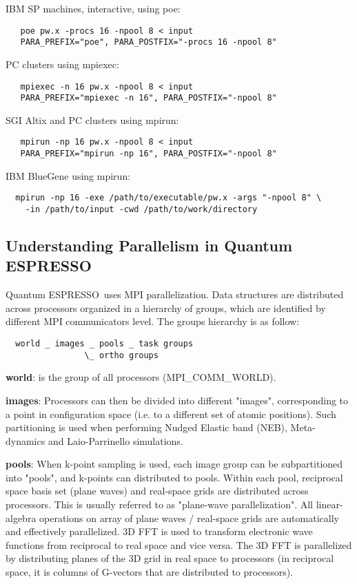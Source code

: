 \documentclass[12pt,a4paper]{article}
\def\qe{{\sc Quantum ESPRESSO}}
\begin{document}
IBM SP machines, interactive, using poe:
\begin{verbatim}
   poe pw.x -procs 16 -npool 8 < input
   PARA_PREFIX="poe", PARA_POSTFIX="-procs 16 -npool 8"
\end{verbatim}
PC clusters using mpiexec:
\begin{verbatim}
   mpiexec -n 16 pw.x -npool 8 < input
   PARA_PREFIX="mpiexec -n 16", PARA_POSTFIX="-npool 8"
\end{verbatim}
SGI Altix and PC clusters using mpirun:
\begin{verbatim}   mpirun -np 16 pw.x -npool 8 < input
   PARA_PREFIX="mpirun -np 16", PARA_POSTFIX="-npool 8"
\end{verbatim}
IBM BlueGene using mpirun:
 \begin{verbatim}
  mpirun -np 16 -exe /path/to/executable/pw.x -args "-npool 8" \
    -in /path/to/input -cwd /path/to/work/directory
\end{verbatim}

\subsection{Understanding Parallelism in \qe}

\qe\ uses MPI parallelization.
Data structures are distributed across processors organized in a hierarchy
of groups, which are identified by different MPI communicators level.
The groups hierarchy is as follow:
\begin{verbatim}
  world _ images _ pools _ task groups
                \_ ortho groups
\end{verbatim}
{\bf world}: is the group of all processors (MPI\_COMM\_WORLD).

{\bf images}: Processors can then be divided into different "images",
corresponding to a point in configuration space (i.e. to
a different set of atomic positions). Such partitioning 
is used when performing Nudged Elastic band (NEB), Meta-dynamics 
and Laio-Parrinello simulations.

{\bf pools}: When k-point sampling is used, each image group can be 
subpartitioned into "pools", and k-points can distributed to pools.
Within each pool, reciprocal space basis set (plane waves)
and real-space grids are distributed across processors.
This is usually referred to as "plane-wave parallelization".
All linear-algebra operations on array of  plane waves / 
real-space grids are automatically and effectively parallelized.
3D FFT is used to transform electronic wave functions from
reciprocal to real space and vice versa. The 3D FFT is
parallelized by distributing planes of the 3D grid in real
space to processors (in reciprocal space, it is columns of
G-vectors that are distributed to processors). 
\end{document}
